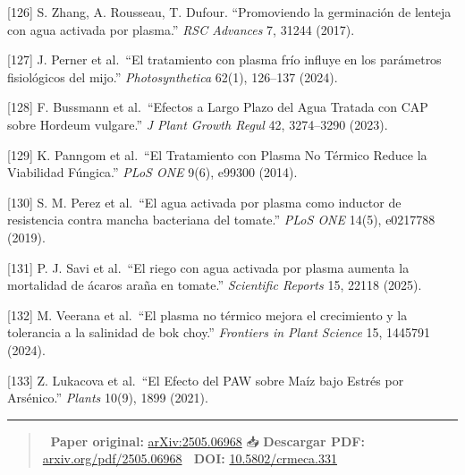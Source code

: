 \documentclass[
]{article}
\begin{document}
{[}126{]} S. Zhang, A. Rousseau, T. Dufour. ``Promoviendo la germinación
de lenteja con agua activada por plasma.'' \emph{RSC Advances} 7, 31244
(2017).

{[}127{]} J. Perner et al.~``El tratamiento con plasma frío influye en
los parámetros fisiológicos del mijo.'' \emph{Photosynthetica} 62(1),
126--137 (2024).

{[}128{]} F. Bussmann et al.~``Efectos a Largo Plazo del Agua Tratada
con CAP sobre Hordeum vulgare.'' \emph{J Plant Growth Regul} 42,
3274--3290 (2023).

{[}129{]} K. Panngom et al.~``El Tratamiento con Plasma No Térmico
Reduce la Viabilidad Fúngica.'' \emph{PLoS ONE} 9(6), e99300 (2014).

{[}130{]} S. M. Perez et al.~``El agua activada por plasma como inductor
de resistencia contra mancha bacteriana del tomate.'' \emph{PLoS ONE}
14(5), e0217788 (2019).

{[}131{]} P. J. Savi et al.~``El riego con agua activada por plasma
aumenta la mortalidad de ácaros araña en tomate.'' \emph{Scientific
Reports} 15, 22118 (2025).

{[}132{]} M. Veerana et al.~``El plasma no térmico mejora el crecimiento
y la tolerancia a la salinidad de bok choy.'' \emph{Frontiers in Plant
Science} 15, 1445791 (2024).

{[}133{]} Z. Lukacova et al.~``El Efecto del PAW sobre Maíz bajo Estrés
por Arsénico.'' \emph{Plants} 10(9), 1899 (2021).

\begin{center}\rule{0.5\linewidth}{0.5pt}\end{center}

\begin{quote}
📄 \textbf{Paper original:}
\href{https://arxiv.org/abs/2505.06968}{arXiv:2505.06968} 📥
\textbf{Descargar PDF:}
\href{https://arxiv.org/pdf/2505.06968}{arxiv.org/pdf/2505.06968} 🔬
\textbf{DOI:}
\href{https://doi.org/10.5802/crmeca.331}{10.5802/crmeca.331}
\end{quote}
\end{document}
